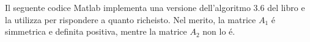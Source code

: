 \begin{center}
\footnotesize\noindent{}\end{center}

\noindent Il seguente codice Matlab implementa una versione dell'algoritmo 3.6 del libro e la utilizza per rispondere a quanto richeisto. Nel merito, la matrice \(A_1\) \'e simmetrica e definita positiva, mentre la matrice \(A_2\) non lo \'e.


